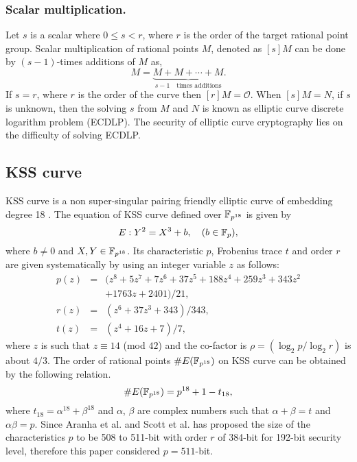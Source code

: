 \subsubsection{Scalar multiplication.}
Let $s$ is a scalar where $0 \leq s < r$, where $r$ is the order of the target rational point group. Scalar multiplication of rational points $M$, denoted as $[s]M$ can be done by $(s-1)$-times additions of $M$ as,
\begin{equation}
[s]M = \underbrace{M+M+ \cdots +M}_{s-1 \quad \mbox{times additions}}.
\end{equation}
If $s = r$, where $r$ is the order of the curve then $[r]M = \mathcal{O}$. When $[s]M = N$, if $s$ is unknown, then the solving $s$ from $M$ and $N$ is known as elliptic curve discrete logarithm problem (ECDLP). The security of elliptic curve cryptography lies on the difficulty of solving ECDLP.


\subsection{KSS curve}
KSS curve is a non super-singular pairing friendly elliptic curve of embedding degree 18 \cite{kss}. The equation of KSS curve defined over $\mathbb{F}_{p^{18}}$ is given by 
\begin{equation}\label{eq:KSS_curve}
E:Y^2=X^3+b, \quad \mbox{($b \in {\mathbb{F}}_{p}$)},
\end{equation}
where $b \neq 0$ and $X,Y \in \mathbb{F}_{p^{18}}$. Its characteristic $p$, Frobenius trace $t$ and order $r$ are given systematically by using an integer variable $z$ as follows:
\begin{subequations}
\begin{eqnarray}
p(z) &= & (z^8 +5z^7 +7z^6 +37z^5 +188z^4 +259z^3 +343z^2  \nonumber \\ 								
& & +1763z+2401)/21,\\\label{eq:kss_char}
r(z) &= &(z^6 + 37z^3 + 343)/343,\label{eq:kss_degree}  \\
t(z) &=& (z^4 + 16z + 7)/7, \label{eq:kss_trace} 
\end{eqnarray}
\end{subequations} 
where $z$ is such that $z \equiv 14$ (mod $42$) and the co-factor is $\rho = (\log_2 p/\log_2 r)$ is about $4/3$.
The order of rational points $\#E(\mathbb{F}_{p^{18}})$ on KSS curve can be obtained by the following relation.
\begin{equation}\label{eq:order_relation}
\#E(\mathbb{F}_{p^{18}}) = p^{18}+1-t_{18},
\end{equation}
where $t_{18} = \alpha^{18}+\beta^{18}$ and $\alpha$, $\beta$ are complex numbers such that $\alpha+\beta = t$ and $\alpha\beta=p$.
Since Aranha et al. \cite{PAIRING:AFKMR12} and Scott et al. \cite{kss_param} has proposed the size of the characteristics $p$ to be 508 to 511-bit with order $r$ of 384-bit  for 192-bit security level, therefore this paper considered $p=511$-bit.

